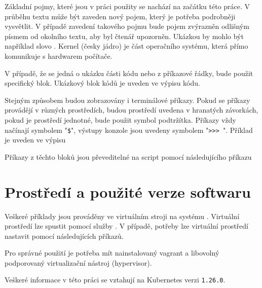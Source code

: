Základní pojmy, které jsou v práci použity se nachází na začátku této práce. V průběhu textu může být zaveden nový pojem, který je potřeba podrobněji vysvětlit. V případě zavedení takového pojmu bude pojem zvýrazněn odlišným písmem od okolního textu, aby byl čtenář upozorněn. Ukázkou by mohlo být například slovo . Kernel (česky jádro) je část operačního systému, která přímo komunikuje s hardwarem počítače.  

V případě, že se jedná o ukázku části kódu nebo z příkazové řádky, bude použit specifický blok. Ukázkový blok kódů je uveden ve výpisu kódu.



Stejným způsobem budou zobrazovány i terminálové příkazy. Pokud se příkazy provádějí v různých prostředích, budou prostředí uvedena v hranatých závorkách, pokud je prostředí jednotné, bude použit symbol podtržítka. Příkazy vždy načínají symbolem "\verb|$|", výstupy konzole jsou uvedeny symbolem "\verb|>>> |". Příklad je uveden ve výpisu


Příkazy z těchto bloků jsou převeditelné na script pomocí následujícího příkazu 


\section{Prostředí a použité verze softwaru}
Veškeré příklady jsou prováděny ve virtuálním stroji na systému . Virtuální prostředí lze spustit pomocí služby . V případě, potřeby lze virtuální prostředí nastavit pomocí následujících příkazů.


Pro správné použití je potřeba mít nainstalovaný vagrant a libovolný podporovaný virtualizační nástroj (hypervisor).

Veškeré informace v této práci se vztahují na Kubernetes verzi \verb|1.26.0|.